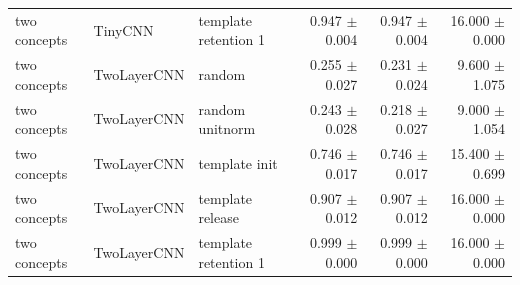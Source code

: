 {\begin{longtable}{p{.15\linewidth}p{.17\linewidth}p{.20\linewidth}rrr}
two concepts & TinyCNN & template retention 1 & 0.947 $\pm$ 0.004 & 0.947 $\pm$ 0.004 & 16.000 $\pm$ 0.000 \\
\addlinespace[2pt]
two concepts & TwoLayerCNN & random & 0.255 $\pm$ 0.027 & 0.231 $\pm$ 0.024 & 9.600 $\pm$ 1.075 \\
two concepts & TwoLayerCNN & random unitnorm & 0.243 $\pm$ 0.028 & 0.218 $\pm$ 0.027 & 9.000 $\pm$ 1.054 \\
two concepts & TwoLayerCNN & template init & 0.746 $\pm$ 0.017 & 0.746 $\pm$ 0.017 & 15.400 $\pm$ 0.699 \\
two concepts & TwoLayerCNN & template release & 0.907 $\pm$ 0.012 & 0.907 $\pm$ 0.012 & 16.000 $\pm$ 0.000 \\
two concepts & TwoLayerCNN & template retention 1 & 0.999 $\pm$ 0.000 & 0.999 $\pm$ 0.000 & 16.000 $\pm$ 0.000 \\
\end{longtable}
\normalsize
}